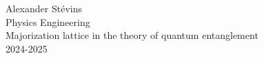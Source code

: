 



\vspace*{\fill}
\noindent Alexander Stévins\\
Physics Engineering\\
Majorization lattice in the theory of quantum entanglement\\
2024-2025


